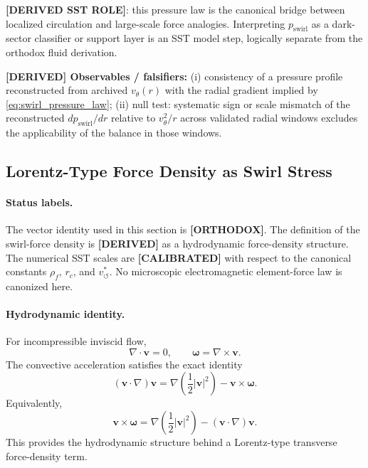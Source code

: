 \documentclass[11pt]{article}
\theoremstyle{definition}
\theoremstyle{plain}
\theoremstyle{remark}
\newcommand{\rhoF}{{\rho_{\!f}}}
\newcommand{\rc}{{r_c}}
\newcommand{\vchar}{v_{\!\boldsymbol{\circlearrowleft}}^{\ast}}
\begin{document}
        \textbf{[DERIVED SST ROLE]}: this pressure law is the canonical bridge between localized circulation and large-scale force analogies. Interpreting $p_{\mathrm{swirl}}$ as a dark-sector classifier or support layer is an SST model step, logically separate from the orthodox fluid derivation.

        \textbf{[DERIVED] Observables / falsifiers:} (i) consistency of a pressure profile reconstructed from archived $v_\theta(r)$ with the radial gradient implied by \eqref{eq:swirl_pressure_law}; (ii) null test: systematic sign or scale mismatch of the reconstructed $dp_{\mathrm{swirl}}/dr$ relative to $v_\theta^2/r$ across validated radial windows excludes the applicability of the balance in those windows.

    \subsection{Lorentz-Type Force Density as Swirl Stress}
    \label{sec:lorentz_type_force_density_as_swirl_stress}

        \paragraph{Status labels.}
        The vector identity used in this section is \textbf{[ORTHODOX]}.  The
        definition of the swirl-force density is \textbf{[DERIVED]} as a hydrodynamic
        force-density structure.  The numerical SST scales are \textbf{[CALIBRATED]}
        with respect to the canonical constants
        \(\rhoF\), \(\rc\), and \(\vchar\).
        No microscopic electromagnetic element-force law is canonized here.

        \paragraph{Hydrodynamic identity.}
        For incompressible inviscid flow,
        \[
        \nabla\cdot\mathbf v=0,
        \qquad
        \boldsymbol{\omega}=\nabla\times\mathbf v .
        \]
        The convective acceleration satisfies the exact identity
        \[
        (\mathbf v\cdot\nabla)\mathbf v
        =
        \nabla\!\left(\frac12|\mathbf v|^2\right)
        -
        \mathbf v\times\boldsymbol{\omega}.
        \]
        Equivalently,
        \[
        \boxed{
        \mathbf v\times\boldsymbol{\omega}
        =
        \nabla\!\left(\frac12|\mathbf v|^2\right)
        -
        (\mathbf v\cdot\nabla)\mathbf v .
        }
        \]
        This provides the hydrodynamic structure behind a Lorentz-type transverse
        force-density term.
\end{document}
